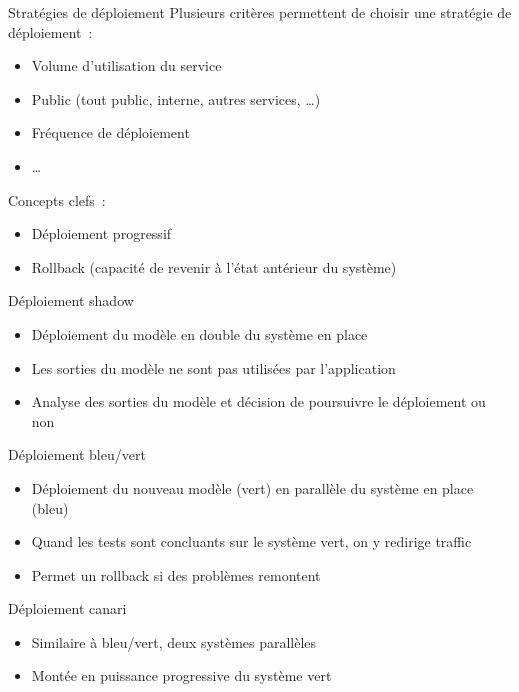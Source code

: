 \begin{frame}{Stratégies de déploiement}
  Plusieurs critères permettent de choisir une stratégie de déploiement~:
  \begin{itemize}
    \item Volume d'utilisation du service
    \item Public (tout public, interne, autres services, …)
    \item Fréquence de déploiement
    \item …
  \end{itemize}

  Concepts clefs~:
  \begin{itemize}
    \item Déploiement progressif
    \item Rollback (capacité de revenir à l'état antérieur du système)
  \end{itemize}
\end{frame}

\begin{frame}{Déploiement shadow}
  \begin{itemize}
    \item Déploiement du modèle en double du système en place
    \item Les sorties du modèle ne sont pas utilisées par l'application
    \item Analyse des sorties du modèle et décision de poursuivre le déploiement ou non
  \end{itemize}
\end{frame}

\begin{frame}{Déploiement bleu/vert}
  \begin{itemize}
    \item Déploiement du nouveau modèle (vert) en parallèle du système en place (bleu)
    \item Quand les tests sont concluants sur le système vert, on y redirige traffic
    \item Permet un rollback si des problèmes remontent
  \end{itemize}
\end{frame}

\begin{frame}{Déploiement canari}
  \begin{itemize}
    \item Similaire à bleu/vert, deux systèmes parallèles
    \item Montée en puissance progressive du système vert
  \end{itemize}
\end{frame}

